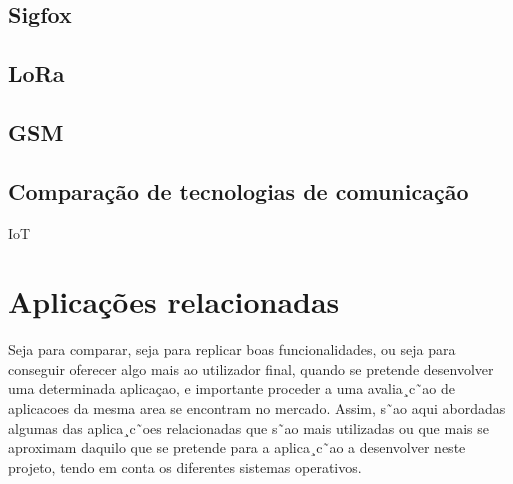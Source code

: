 \subsection{Sigfox}

\subsection{LoRa}


\subsection{GSM}



\subsection{Comparação de tecnologias de comunicação}





\ac{IoT}


\section{Aplicações relacionadas}

Seja para comparar, seja para replicar boas funcionalidades, ou seja para conseguir oferecer
algo mais ao utilizador final, quando se pretende desenvolver uma determinada aplicaçao, e
importante proceder a uma avalia¸c˜ao de aplicacoes da mesma area se encontram no mercado.
Assim, s˜ao aqui abordadas algumas das aplica¸c˜oes relacionadas que s˜ao mais utilizadas ou
que mais se aproximam daquilo que se pretende para a aplica¸c˜ao a desenvolver neste projeto,
tendo em conta os diferentes sistemas operativos.

